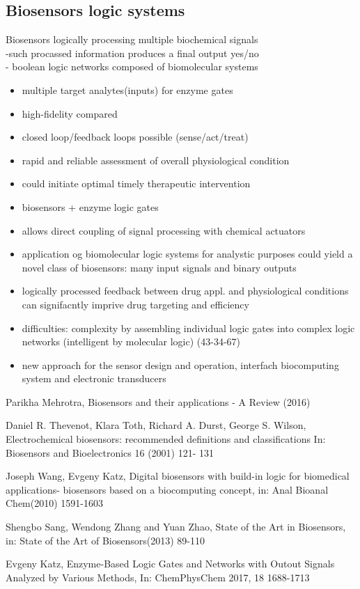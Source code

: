 \documentclass[runningheads]{llncs}
\begin{document}
	\subsection{Biosensors  logic systems}
	Biosensors logically processing multiple biochemical signals\\
	-such procassed information produces a final output yes/no \\
	- boolean logic networks composed of biomolecular systems\\	
	\begin{itemize}
		\item multiple target analytes(inputs) for enzyme gates
		\item high-fidelity compared
		\item closed loop/feedback loops possible (sense/act/treat)
		\item rapid and reliable assessment of overall physiological condition
		\item could initiate optimal timely therapeutic intervention
		\item biosensors + enzyme logic gates
		\item allows direct coupling of signal processing with chemical actuators 
		\item application og biomolecular logic systems for analystic purposes could yield a novel class of biosensors: many input signals and binary outputs
		\item logically processed feedback between drug appl. and physiological conditions can signifacntly imprive drug targeting and efficiency 
		
		\item difficulties: complexity by assembling individual logic gates into complex logic networks (intelligent by molecular logic) (43-34-67)
		\item new approach for the sensor design and operation, interfach biocomputing system and electronic transducers
	\end{itemize}


\begin{thebibliography}{8}
	Parikha Mehrotra, Biosensors and their applications - A Review (2016)
	
	Daniel R. Thevenot, Klara Toth, Richard A. Durst, George S. Wilson, Electrochemical biosensors: recommended definitions and classifications In: Biosensors and Bioelectronics 16 (2001) 121- 131
	
	Joseph Wang, Evgeny Katz, Digital biosensors with build-in logic for biomedical applications- biosensors based on a biocomputing concept, in: Anal Bioanal Chem(2010) 1591-1603
	
	Shengbo Sang, Wendong Zhang and Yuan Zhao, State of the Art in Biosensors, in: State of the Art of Biosensors(2013) 89-110
	
	Evgeny Katz, Enzyme-Based Logic Gates and Networks with Outout Signals Analyzed by Various Methods, In: ChemPhysChem 2017, 18 1688-1713
	
\end{thebibliography}
\end{document}
